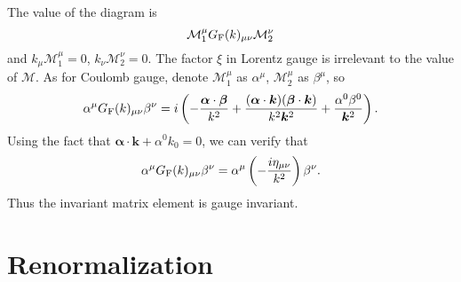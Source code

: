 \noindent
The value of the diagram is
\[\mathcal{M}_{1}^{\mu} G_{\rm F}(k)_{\mu\nu}\mathcal{M}_{2}^{\nu}\]
and $k_{\mu}\mathcal{M}_{1}^{\mu}=0$, $k_{\nu}\mathcal{M}_{2}^{\nu}=0$.
The factor $\xi$ in Lorentz gauge is irrelevant to the value of $\mathcal{M}$. 
As for Coulomb gauge, denote $\mathcal{M}_{1}^{\mu}$ as $\alpha^{\mu}$, $\mathcal{M}_{2}^{\mu}$ as $\beta^{\mu}$, so 
\[\alpha^{\mu} G_{\rm F}(k)_{\mu\nu} \beta^{\nu} = i\left( -\frac{\bm{\alpha} \cdot \bm{\beta}}{k^2} + \frac{(\bm{\alpha}\cdot\bm{k})(\bm{\beta}\cdot\bm{k})}{k^2 \bm{k}^2} + \frac{\alpha^0 \beta^0 }{\bm{k}^2} \right).\]
Using the fact that $\bm{\alpha}\cdot\bm{k} + \alpha^0 k_0 = 0$, we can verify that
\[\alpha^{\mu} G_{\rm F}(k)_{\mu\nu} \beta^{\nu} = \alpha^{\mu} \left( -\frac{i\eta_{\mu\nu}}{k^2} \right)\beta^{\nu}.\]
Thus the invariant matrix element is gauge invariant.

\section{Renormalization}

